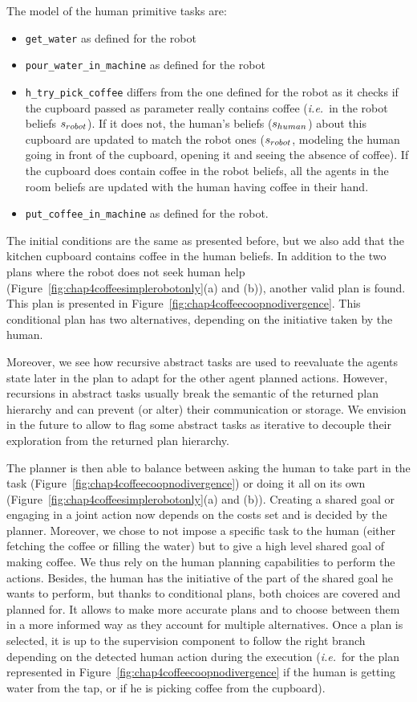 \documentclass[a4paper,11pt,twoside]{StyleThese}
\begin{document}
The model of the human primitive tasks are:
\begin{itemize}
\item \verb'get_water' as defined for the robot
\item \verb'pour_water_in_machine' as defined for the robot
\item \verb'h_try_pick_coffee' differs from the one defined for the robot as it checks if the cupboard passed as parameter really contains coffee (\textit{i.e.}~in the robot beliefs $s_{robot}$). If it does not, the human's beliefs ($s_{human}$) about this cupboard are updated to match the robot ones ($s_{robot}$, modeling the human going in front of the cupboard, opening it and seeing the absence of coffee). If the cupboard does contain coffee in the robot beliefs, all the agents in the room beliefs are updated with the human having coffee in their hand.
\item \verb'put_coffee_in_machine' as defined for the robot.
\end{itemize}

The initial conditions are the same as presented before, but we also add that the kitchen cupboard contains coffee in the human beliefs. In addition to the two plans where the robot does not seek human help (Figure~\ref{fig:chap4coffeesimplerobotonly}(a) and (b)), another valid plan is found. This plan is presented in Figure~\ref{fig:chap4coffeecoopnodivergence}. This conditional plan has two alternatives, depending on the initiative taken by the human.

Moreover, we see how recursive abstract tasks are used to reevaluate the agents state later in the plan to adapt for the other agent planned actions. However, recursions in abstract tasks usually break the semantic of the returned plan hierarchy and can prevent (or alter) their communication or storage. We envision in the future to allow to flag some abstract tasks as iterative to decouple their exploration from the returned plan hierarchy.

The planner is then able to balance between asking the human to take part in the task (Figure~\ref{fig:chap4coffeecoopnodivergence}) or doing it all on its own (Figure~\ref{fig:chap4coffeesimplerobotonly}(a) and (b)). Creating a shared goal or engaging in a joint action now depends on the costs set and is decided by the planner. Moreover, we chose to not impose a specific task to the human (either fetching the coffee or filling the water) but to give a high level shared goal of making coffee. We thus rely on the human planning capabilities to perform the actions. Besides, the human has the initiative of the part of the shared goal he wants to perform, but thanks to conditional plans, both choices are covered and planned for. It allows to make more accurate plans and to choose between them in a more informed way as they account for multiple alternatives. Once a plan is selected, it is up to the supervision component to follow the right branch depending on the detected human action during the execution (\textit{i.e.}~for the plan represented in Figure~\ref{fig:chap4coffeecoopnodivergence} if the human is getting water from the tap, or if he is picking coffee from the cupboard).
\end{document}
